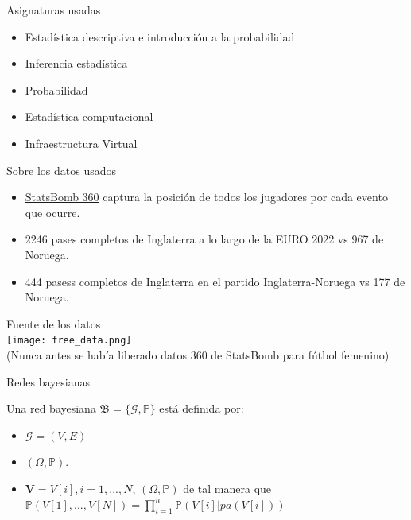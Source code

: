 \documentclass{beamer}
\begin{document}
\begin{frame}{Asignaturas usadas}
	\begin{itemize}
		\item Estadística descriptiva e introducción a la probabilidad 
		\item Inferencia estadística 
		\item Probabilidad 
		\item Estadística computacional 
		\item Infraestructura Virtual
	\end{itemize}
\end{frame}

\begin{frame}{Sobre los datos usados}
	\begin{itemize}
		\item \href{https://statsbomb.com/articles/soccer/statsbomb-release-free-360-data-womens-euro-2022-available-now/}{StatsBomb 360}
		captura la posición de todos los jugadores por cada evento que ocurre.
		\item 2246 pases completos de Inglaterra a lo largo de la EURO 2022 vs 967 de Noruega.
		\item 444 pasess completos de Inglaterra en el partido Inglaterra-Noruega vs 177 de Noruega.
	\end{itemize}
	\begin{center}
		Fuente de los datos \\[12pt]
		\texttt{[image: free\_data.png]}
		\\
		\footnotesize(Nunca antes se había liberado datos 360 de StatsBomb para fútbol femenino)
    \end{center}
\end{frame}

\begin{frame}{Redes bayesianas}
    \begin{definition} 
        Una red bayesiana $\mathfrak{B} = \lbrace \mathcal{G}, \mathbb{P} \rbrace$ está definida por:
        \begin{itemize}
            \item $\mathcal{G}=(V,E)$ 
            \item $(\Omega, \mathbb{P})$.
            \item $\textbf{V}=V[i], i=1,...,N$, $(\Omega, \mathbb{P})$ 
            de tal manera que $\mathbb{P}(V[1],...,V[N])= \prod_{i=1}^{n}\mathbb{P}(V[i]|pa(V[i]))$
        \end{itemize}
    \end{definition}     
\end{frame}
\end{document}

